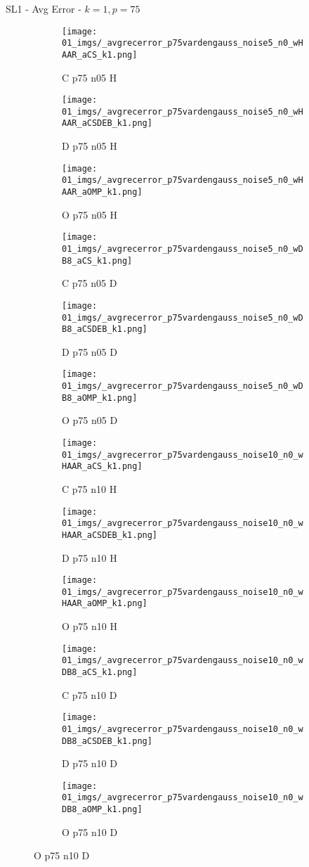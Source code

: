 \begin{frame}{SL1 - Avg Error - $k=1,p=75$}{}
\begin{figure}
\begin{subfigure}{0.13\textwidth}
\texttt{[image: 01\_imgs/\_avgrecerror\_p75vardengauss\_noise5\_n0\_wHAAR\_aCS\_k1.png]}
\caption*{\tiny C p75 n05 H}
\end{subfigure}
\begin{subfigure}{0.13\textwidth}
\texttt{[image: 01\_imgs/\_avgrecerror\_p75vardengauss\_noise5\_n0\_wHAAR\_aCSDEB\_k1.png]}
\caption*{\tiny D p75 n05 H}
\end{subfigure}
\begin{subfigure}{0.13\textwidth}
\texttt{[image: 01\_imgs/\_avgrecerror\_p75vardengauss\_noise5\_n0\_wHAAR\_aOMP\_k1.png]}
\caption*{\tiny O p75 n05 H}
\end{subfigure}
\begin{subfigure}{0.13\textwidth}
\texttt{[image: 01\_imgs/\_avgrecerror\_p75vardengauss\_noise5\_n0\_wDB8\_aCS\_k1.png]}
\caption*{\tiny C p75 n05 D}
\end{subfigure}
\begin{subfigure}{0.13\textwidth}
\texttt{[image: 01\_imgs/\_avgrecerror\_p75vardengauss\_noise5\_n0\_wDB8\_aCSDEB\_k1.png]}
\caption*{\tiny D p75 n05 D}
\end{subfigure}
\begin{subfigure}{0.13\textwidth}
\texttt{[image: 01\_imgs/\_avgrecerror\_p75vardengauss\_noise5\_n0\_wDB8\_aOMP\_k1.png]}
\caption*{\tiny O p75 n05 D}
\end{subfigure}

\vspace{5pt}

\begin{subfigure}{0.13\textwidth}
\texttt{[image: 01\_imgs/\_avgrecerror\_p75vardengauss\_noise10\_n0\_wHAAR\_aCS\_k1.png]}
\caption*{\tiny C p75 n10 H}
\end{subfigure}
\begin{subfigure}{0.13\textwidth}
\texttt{[image: 01\_imgs/\_avgrecerror\_p75vardengauss\_noise10\_n0\_wHAAR\_aCSDEB\_k1.png]}
\caption*{\tiny D p75 n10 H}
\end{subfigure}
\begin{subfigure}{0.13\textwidth}
\texttt{[image: 01\_imgs/\_avgrecerror\_p75vardengauss\_noise10\_n0\_wHAAR\_aOMP\_k1.png]}
\caption*{\tiny O p75 n10 H}
\end{subfigure}
\begin{subfigure}{0.13\textwidth}
\texttt{[image: 01\_imgs/\_avgrecerror\_p75vardengauss\_noise10\_n0\_wDB8\_aCS\_k1.png]}
\caption*{\tiny C p75 n10 D}
\end{subfigure}
\begin{subfigure}{0.13\textwidth}
\texttt{[image: 01\_imgs/\_avgrecerror\_p75vardengauss\_noise10\_n0\_wDB8\_aCSDEB\_k1.png]}
\caption*{\tiny D p75 n10 D}
\end{subfigure}
\begin{subfigure}{0.13\textwidth}
\texttt{[image: 01\_imgs/\_avgrecerror\_p75vardengauss\_noise10\_n0\_wDB8\_aOMP\_k1.png]}
\caption*{\tiny O p75 n10 D}
\end{subfigure}


\end{figure}
\end{frame}
